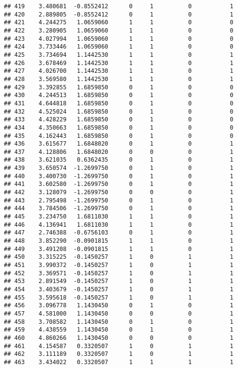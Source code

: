 \documentclass[
]{article}
\begin{document}
\begin{verbatim}
## 419    3.480681  -0.8552412      0     1          0           1
## 420    2.889805  -0.8552412      0     1          0           1
## 421    4.244275   1.0659060      1     1          0           0
## 422    3.280905   1.0659060      1     1          0           0
## 423    4.027994   1.0659060      1     1          0           0
## 424    3.733446   1.0659060      1     1          0           0
## 425    3.734694   1.1442530      1     1          0           1
## 426    3.678469   1.1442530      1     1          0           1
## 427    4.026700   1.1442530      1     1          0           1
## 428    3.569580   1.1442530      1     1          0           1
## 429    3.392855   1.6859850      0     1          0           0
## 430    4.244513   1.6859850      0     1          0           0
## 431    4.644818   1.6859850      0     1          0           0
## 432    4.525024   1.6859850      0     1          0           0
## 433    4.428229   1.6859850      0     1          0           0
## 434    4.350663   1.6859850      0     1          0           0
## 435    4.162443   1.6859850      0     1          0           0
## 436    3.615677   1.6848020      0     1          0           1
## 437    4.128806   1.6848020      0     0          0           1
## 438    3.621035   0.6362435      0     1          0           1
## 439    3.650574  -1.2699750      0     1          0           1
## 440    3.400730  -1.2699750      0     1          0           1
## 441    3.602580  -1.2699750      0     1          0           1
## 442    3.128079  -1.2699750      0     0          0           1
## 443    2.795498  -1.2699750      0     1          0           1
## 444    3.784506  -1.2699750      0     1          0           1
## 445    3.234750   1.6811030      1     1          0           1
## 446    4.136941   1.6811030      1     1          0           1
## 447    2.746388  -0.6756103      0     1          0           1
## 448    3.852290  -0.0901815      1     1          0           1
## 449    3.491208  -0.0901815      1     1          0           1
## 450    3.315225  -0.1450257      1     0          1           1
## 451    3.990372  -0.1450257      1     0          1           1
## 452    3.369571  -0.1450257      1     0          1           1
## 453    2.891549  -0.1450257      1     0          1           1
## 454    3.403679  -0.1450257      1     0          1           1
## 455    3.595618  -0.1450257      1     0          1           1
## 456    3.096778   1.1430450      0     1          0           1
## 457    4.581000   1.1430450      0     0          0           1
## 458    3.708582   1.1430450      0     1          0           1
## 459    4.438559   1.1430450      0     1          0           1
## 460    4.860266   1.1430450      0     0          0           1
## 461    4.154587   0.3320507      1     0          1           1
## 462    3.111189   0.3320507      1     0          1           1
## 463    3.434022   0.3320507      1     1          1           1
\end{verbatim}
\end{document}
